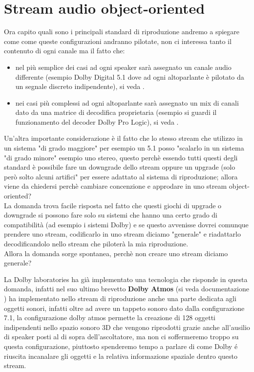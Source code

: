 \documentclass[12pt,a4paper]{report}
\begin{document}
\section{Stream audio object-oriented}

Ora capito quali sono i principali standard di riproduzione andremo a spiegare come come queste configurazioni andranno pilotate, non ci interessa tanto il contenuto di ogni canale ma il fatto che: 

\begin{itemize}
\item nel più semplice dei casi ad ogni speaker sarà assegnato un canale audio differente (esempio Dolby Digital 5.1 dove ad ogni altoparlante è pilotato da un segnale discreto indipendente), si veda \cite{digital}.
\item nei casi più complessi ad ogni altoparlante sarà assegnato un mix di canali dato da una matrice di decodifica proprietaria (esempio si guardi il funzionamento del decoder Dolby Pro Logic), si veda \cite{prologic}.
\end{itemize}

Un'altra importante considerazione è il fatto che lo stesso stream che utilizzo in un sistema "di grado maggiore" per esempio un 5.1 posso "scalarlo in un sistema "di grado minore" esempio uno stereo, questo perchè essendo tutti questi degli standard è possibile fare un downgrade dello stream oppure un upgrade (solo però solto alcuni artifici" per essere adattato al sistema di riproduzione; allora viene da chiedersi perchè cambiare concenzione e approdare in uno stream object-oriented?\\

La domanda trova facile risposta nel fatto che questi giochi di upgrade o downgrade si possono fare solo su sistemi che hanno una certo grado di compatibilità (ad esempio i sistemi Dolby) e se questo avvenisse dovrei comunque prendere uno stream, codificarlo in uno stream diciamo "generale" e riadattarlo decodificandolo nello stream che piloterà la mia riproduzione.\\

Allora la domanda sorge spontanea, perchè non creare uno stream diciamo generale?

La Dolby laboratories ha già implementato una tecnologia che risponde in questa domanda, infatti nel suo ultimo brevetto \textbf{Dolby Atmos} (si veda documentazione \cite{atmos}) ha implementato nello stream di riproduzione anche una parte dedicata agli oggetti sonori, infatti oltre ad avere un tappeto sonoro dato dalla configurazione 7.1, la configurazione dolby atmos permette la creazione di 128 oggetti indipendenti nello spazio sonoro 3D che vengono riprodotti grazie anche all'ausilio di speaker posti al di sopra dell'ascoltatore, ma non ci soffermeremo troppo su questa configurazione, piuttosto spenderemo tempo a parlare di come Dolby é riuscita incanalare gli oggetti e la relativa informazione spaziale dentro questo stream.\\
\end{document}
